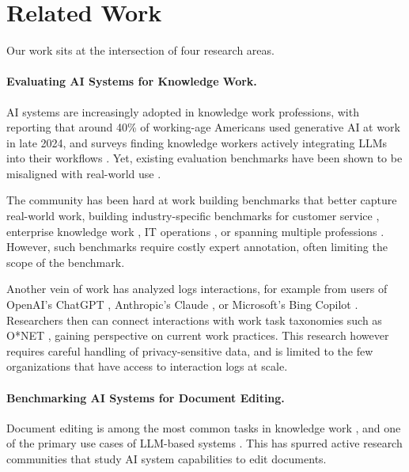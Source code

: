 \documentclass{article} %
\begin{document}
\section{Related Work} \label{sec:rel_work}

Our work sits at the intersection of four research areas.

\paragraph{Evaluating AI Systems for Knowledge Work.}

AI systems are increasingly adopted in knowledge work professions, with \citet{Bick2024TheRA} reporting that around 40\% of working-age Americans used generative AI at work in late 2024, and surveys finding knowledge workers actively integrating LLMs into their workflows \citep{Brachman2024HowKW,Ulloa2025ProductMP}. Yet, existing evaluation benchmarks have been shown to be misaligned with real-world use \citep{Wang2026HowWD}.

The community has been hard at work building benchmarks that better capture real-world work, building industry-specific benchmarks for customer service \citep{Huang2024CRMArenaUT,Yao2024taubenchAB}, enterprise knowledge work \citep{Drouin2024WorkArenaHC,Xu2024TheAgentCompanyBL}, IT operations \citep{Jha2025ITBenchEA}, or spanning multiple professions \citep{Chen2025xbenchTA,Patwardhan2025GDPvalEA,Mazeika2025RemoteLI}. However, such benchmarks require costly expert annotation, often limiting the scope of the benchmark.

Another vein of work has analyzed logs interactions, for example from users of OpenAI's ChatGPT \citep{Chatterji2025HowPU}, Anthropic's Claude \citep{Handa2025WhichET}, or Microsoft's Bing Copilot \citep{Tomlinson2025WorkingWA}. Researchers then can connect interactions with work task taxonomies such as O*NET \citep{Peterson2001UNDERSTANDINGWU}, gaining perspective on current work practices. This research however requires careful handling of privacy-sensitive data, and is limited to the few organizations that have access to interaction logs at scale.

\paragraph{Benchmarking AI Systems for Document Editing.}

Document editing is among the most common tasks in knowledge work \citep{Siu2025AugmentingEC}, and one of the primary use cases of LLM-based systems \citep{Handa2025WhichET,Eloundou2023GPTsAG}. This has spurred active research communities that study AI system capabilities to edit documents.
\end{document}
